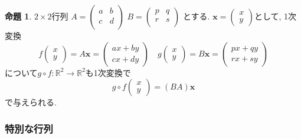 \documentclass[dvipdfmx,a4paper,11pt]{article} %
\newcommand{\R}{\mathbb{R}}
\theoremstyle{definition}
\newtheorem{prop}[thm]{命題}
\begin{document}
 
 \begin{prop}
\label{prop-matrix-comp}
  $2 \times 2$行列
$
A=\begin{pmatrix}
a & b\\
c & d \\
\end{pmatrix}
$
$B=
\begin{pmatrix}
p& q\\
r & s \\
\end{pmatrix}
$
とする. 
$\bm{x} = \begin{pmatrix}
x \\ y
 \end{pmatrix} $として, 1次変換
$$
f
\begin{pmatrix}
x \\ y
 \end{pmatrix} 
  =
 A \bm{x}
  = 
 \begin{pmatrix}
a x + by\\ cx + dy
 \end{pmatrix} 
 \quad
 g
\begin{pmatrix}
x \\ y
 \end{pmatrix} 
  =
 B \bm{x}
  = 
 \begin{pmatrix}
p x + qy\\ rx + sy
 \end{pmatrix} 
$$
について$g\circ f : \R^2 \to \R^2$も1次変換で
$$
g \circ f
\begin{pmatrix}
x \\ y
 \end{pmatrix} 
  =
 (BA) \bm{x}
 $$
 で与えられる. 
 \end{prop}


\subsubsection{特別な行列}
\end{document}
